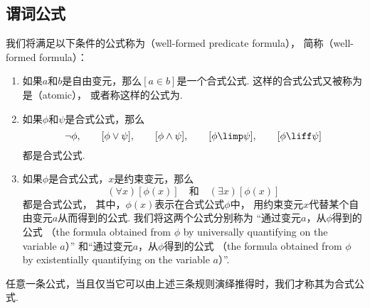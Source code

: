 \subsection{谓词公式}

我们将满足以下条件的公式称为（well-formed predicate formula），
简称（well-formed formula）：
\begin{enumerate}
	\item 如果\(a\)和\(b\)是自由变元，那么\([a \in b]\)是一个合式公式.
	这样的合式公式又被称为是（atomic），
	或者称这样的公式为.

	\item 如果\(\phi\)和\(\psi\)是合式公式，那么\begin{equation*}
		\neg \phi, \qquad
		[\phi \lor \psi], \qquad
		[\phi \land \psi], \qquad
		[\phi \limp \psi], \qquad
		[\phi \liff \psi]
	\end{equation*}
	都是合式公式.

	\item 如果\(\phi\)是合式公式，\(x\)是约束变元，那么\begin{equation*}
		(\forall x)[\phi(x)]
		\quad\text{和}\quad
		(\exists x)[\phi(x)]
	\end{equation*}
	都是合式公式，
	其中，\(\phi(x)\)表示在合式公式\(\phi\)中，
	用约束变元\(x\)代替某个自由变元\(a\)从而得到的公式.
	我们将这两个公式分别称为
	“通过变元\(a\)，从\(\phi\)得到的公式
	（the formula obtained from \(\phi\) by universally quantifying on the variable \(a\)）”
	和“通过变元\(a\)，从\(\phi\)得到的公式
	（the formula obtained from \(\phi\) by existentially quantifying on the variable \(a\)）”.
\end{enumerate}
任意一条公式，当且仅当它可以由上述三条规则演绎推得时，我们才称其为合式公式.

